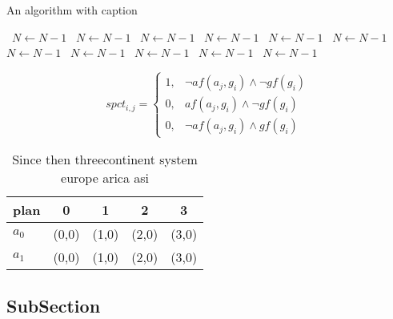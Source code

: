 \documentclass[a4paper]{article}
\begin{document}
\begin{algorithm}
\caption{An algorithm with caption}
\begin{algorithmic}
\    \State $N \gets N - 1$
\    \State $N \gets N - 1$
\    \State $N \gets N - 1$
\    \State $N \gets N - 1$
\    \State $N \gets N - 1$
\    \State $N \gets N - 1$
\    \State $N \gets N - 1$
\    \State $N \gets N - 1$
\    \State $N \gets N - 1$
\    \State $N \gets N - 1$
\    \State $N \gets N - 1$
\EndWhile
\end{algorithmic}
\end{algorithm}

\begin{equation}
spct_{i,j} =
\begin{cases}
1, & \text{$\neg af(a_j,g_i) \wedge \neg gf(g_i)$}\\
0, & \text{$af(a_j,g_i) \wedge \neg gf(g_i)$}\\
0, & \text{$\neg af(a_j,g_i) \wedge gf(g_i)$}
\end{cases}
\end{equation}

\begin{table}
\begin{adjustbox}{width=0.8\columnwidth}
\begin{tabular}{|l|l|l|l|l|}
\hline
\textbf{plan} & \multicolumn{1}{c|}{\textbf{0}} & \multicolumn{1}{c|}{\textbf{1}} & \multicolumn{1}{c|}{\textbf{2}} & \multicolumn{1}{c|}{\textbf{3}} \\ \hline
\textbf{$a_0$}  & (0,0) & (1,0) & (2,0) & (3,0) \\ \hline
\textbf{$a_1$}  & (0,0) & (1,0) & (2,0) & (3,0) \\ \hline
\end{tabular}
\end{adjustbox}
\caption{Since then threecontinent system europe arica asi
}
\end{table}

\subsection{SubSection}
\end{document}

